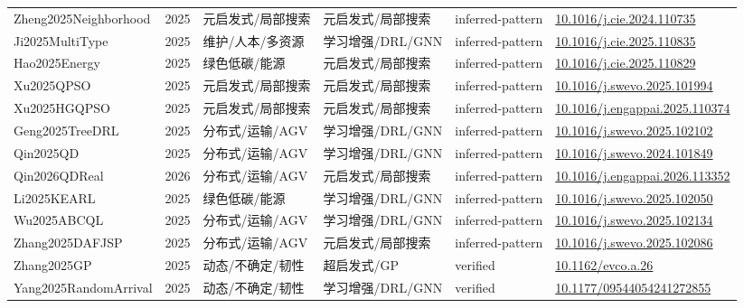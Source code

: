 \documentclass[UTF8,a4paper,11pt]{ctexart}
\begin{document}
\begin{landscape}
\begin{longtable}{>{\raggedright\arraybackslash}p{5.0cm}p{0.8cm}>{\raggedright\arraybackslash}p{2.6cm}>{\raggedright\arraybackslash}p{2.8cm}>{\raggedright\arraybackslash}p{2.6cm}>{\raggedright\arraybackslash}p{5.4cm}}
Zheng2025Neighborhood & 2025 & 元启发式/局部搜索 & 元启发式/局部搜索 & inferred-pattern & \href{https://doi.org/10.1016/j.cie.2024.110735}{10.1016/j.cie.2024.110735} \\
Ji2025MultiType & 2025 & 维护/人本/多资源 & 学习增强/DRL/GNN & inferred-pattern & \href{https://doi.org/10.1016/j.cie.2025.110835}{10.1016/j.cie.2025.110835} \\
Hao2025Energy & 2025 & 绿色低碳/能源 & 元启发式/局部搜索 & inferred-pattern & \href{https://doi.org/10.1016/j.cie.2025.110829}{10.1016/j.cie.2025.110829} \\
Xu2025QPSO & 2025 & 元启发式/局部搜索 & 元启发式/局部搜索 & inferred-pattern & \href{https://doi.org/10.1016/j.swevo.2025.101994}{10.1016/j.swevo.2025.101994} \\
Xu2025HGQPSO & 2025 & 元启发式/局部搜索 & 元启发式/局部搜索 & inferred-pattern & \href{https://doi.org/10.1016/j.engappai.2025.110374}{10.1016/j.engappai.2025.110374} \\
Geng2025TreeDRL & 2025 & 分布式/运输/AGV & 学习增强/DRL/GNN & inferred-pattern & \href{https://doi.org/10.1016/j.swevo.2025.102102}{10.1016/j.swevo.2025.102102} \\
Qin2025QD & 2025 & 分布式/运输/AGV & 学习增强/DRL/GNN & inferred-pattern & \href{https://doi.org/10.1016/j.swevo.2024.101849}{10.1016/j.swevo.2024.101849} \\
Qin2026QDReal & 2026 & 分布式/运输/AGV & 元启发式/局部搜索 & inferred-pattern & \href{https://doi.org/10.1016/j.engappai.2026.113352}{10.1016/j.engappai.2026.113352} \\
Li2025KEARL & 2025 & 绿色低碳/能源 & 学习增强/DRL/GNN & inferred-pattern & \href{https://doi.org/10.1016/j.swevo.2025.102050}{10.1016/j.swevo.2025.102050} \\
Wu2025ABCQL & 2025 & 分布式/运输/AGV & 学习增强/DRL/GNN & inferred-pattern & \href{https://doi.org/10.1016/j.swevo.2025.102134}{10.1016/j.swevo.2025.102134} \\
Zhang2025DAFJSP & 2025 & 分布式/运输/AGV & 元启发式/局部搜索 & inferred-pattern & \href{https://doi.org/10.1016/j.swevo.2025.102086}{10.1016/j.swevo.2025.102086} \\
Zhang2025GP & 2025 & 动态/不确定/韧性 & 超启发式/GP & verified & \href{https://doi.org/10.1162/evco.a.26}{10.1162/evco.a.26} \\
Yang2025RandomArrival & 2025 & 动态/不确定/韧性 & 学习增强/DRL/GNN & verified & \href{https://doi.org/10.1177/09544054241272855}{10.1177/09544054241272855} \\

\end{longtable}
\end{landscape}
\end{document}
